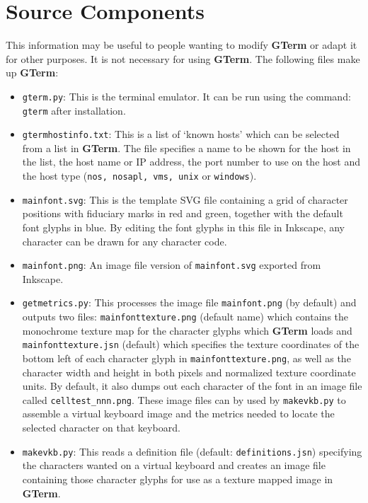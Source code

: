 \documentclass[a4paper,twoside,11pt]{article}
\begin{document}
\section{Source Components}
This information may be useful to people wanting to modify \textbf{GTerm} or
adapt it for other purposes. It is not necessary for using \textbf{GTerm}.
The following files make up \textbf{GTerm}:
\begin{itemize}
\item \texttt{gterm.py}: This is the terminal emulator. It can be run using the command: \texttt{gterm} after installation.
\item \texttt{gtermhostinfo.txt}: This is a list of `known hosts' which can be selected from a list in \textbf{GTerm}. The file
      specifies a name to be shown for the host in the list, the host name or IP address, the port number to use on the
      host and the host type (\texttt{nos, nosapl, vms, unix} or \texttt{windows}). 
\item \texttt{mainfont.svg}: This is the template SVG file containing a grid of character positions with fiduciary marks in
      red and green, together with the default font glyphs in blue. By editing the font glyphs in this file in
      Inkscape, any character can be drawn for any character code.
\item \texttt{mainfont.png}: An image file version of \texttt{mainfont.svg} exported from Inkscape.
\item \texttt{getmetrics.py}: This processes the image file \texttt{mainfont.png} (by default) and outputs two files:
      \texttt{mainfonttexture.png}
      (default name) which contains the monochrome texture map for the character glyphs which \textbf{GTerm} loads and 
      \texttt{mainfonttexture.jsn} (default) which specifies the texture coordinates of the bottom left of each character glyph
      in \texttt{mainfonttexture.png}, as well as the character width and height in both pixels and normalized texture
      coordinate units. By default, it also dumps out each character of the font in an image file called
      \texttt{celltest\_nnn.png}. These image files can by used by \texttt{makevkb.py}
      to assemble a virtual keyboard image and the metrics
      needed to locate the selected character on that keyboard.
\item \texttt{makevkb.py}: This reads a definition file (default: \texttt{definitions.jsn})
      specifying the characters wanted on a virtual
      keyboard and creates an image file containing those character glyphs for use as a texture mapped image in \textbf{GTerm}.

\end{itemize}
\end{document}
